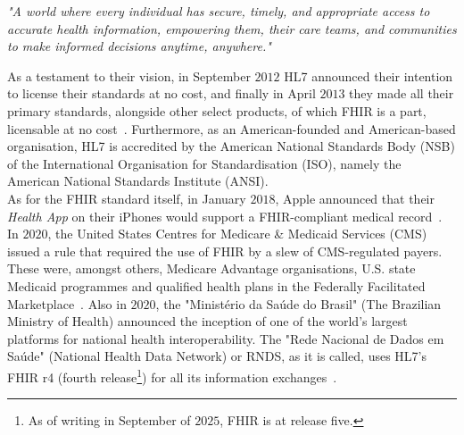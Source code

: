 \begin{center}
    \emph{"A world where every individual has secure, timely, and appropriate access to accurate health information, empowering them, their care teams, and communities to make informed decisions anytime, anywhere."}
\end{center}
As a testament to their vision, in September $2012$ HL7 announced their intention to license their standards at no cost, and finally in April $2013$ they made all their primary standards, alongside other select products, of which FHIR is a part, licensable at no cost~\cite{HL7-no-cost}. Furthermore, as an American-founded and American-based organisation, HL7 is accredited by the American National Standards Body (NSB) of the International Organisation for Standardisation (ISO), namely the American National Standards Institute (ANSI).
\\
As for the FHIR standard itself, in January $2018$, Apple announced that their \emph{Health App} on their iPhones would support a FHIR-compliant medical record~\cite{Apple-Health}. In $2020$, the United States Centres for Medicare \& Medicaid Services (CMS) issued a rule that required the use of FHIR by a slew of CMS-regulated payers. These were, amongst others, Medicare Advantage organisations, U.S. state Medicaid programmes and qualified health plans in the Federally Facilitated Marketplace~\cite{CMS-9115-F}. Also in $2020$, the "Minist\'{e}rio da Sa\'{u}de do Brasil" (The Brazilian Ministry of Health) announced the inception of one of the world's largest platforms for national health interoperability. The "Rede Nacional de Dados em Sa\'{u}de" (National Health Data Network) or RNDS, as it is called, uses HL7's FHIR r4 (fourth release\footnote{As of writing in September of $2025$, FHIR is at release five.}) for all its information exchanges~\cite{RNDS}.

